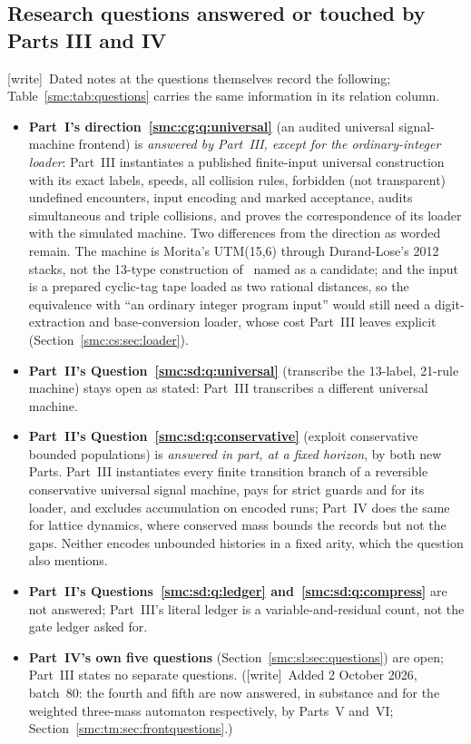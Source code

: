 \documentclass[11pt,letterpaper]{article}
\numberwithin{equation}{section}
\theoremstyle{definition}
\theoremstyle{remark}
\newcommand{\wtag}{\textup{[write]}}
\begin{document}
\subsection{Research questions answered or touched by Parts III and IV}\label{smc:cs:sec:questions}

\wtag\ Dated notes at the questions themselves record the following; Table~\ref{smc:tab:questions} carries the same information in its relation column.
\begin{itemize}
\item \textbf{Part~I's direction~\ref{smc:cg:q:universal}} (an audited universal signal-machine frontend) is \emph{answered by Part~III, except for the ordinary-integer loader}: Part~III instantiates a published finite-input universal construction with its exact labels, speeds, all collision rules, forbidden (not transparent) undefined encounters, input encoding and marked acceptance, audits simultaneous and triple collisions, and proves the correspondence of its loader with the simulated machine. Two differences from the direction as worded remain. The machine is Morita's UTM(15,6) through Durand-Lose's 2012 stacks, not the 13-type construction of~\cite{durandlose} named as a candidate; and the input is a prepared cyclic-tag tape loaded as two rational distances, so the equivalence with ``an ordinary integer program input'' would still need a digit-extraction and base-conversion loader, whose cost Part~III leaves explicit (Section~\ref{smc:cs:sec:loader}).
\item \textbf{Part~II's Question~\ref{smc:sd:q:universal}} (transcribe the 13-label, 21-rule machine) stays open as stated: Part~III transcribes a different universal machine.
\item \textbf{Part~II's Question~\ref{smc:sd:q:conservative}} (exploit conservative bounded populations) is \emph{answered in part, at a fixed horizon}, by both new Parts. Part~III instantiates every finite transition branch of a reversible conservative universal signal machine, pays for strict guards and for its loader, and excludes accumulation on encoded runs; Part~IV does the same for lattice dynamics, where conserved mass bounds the records but not the gaps. Neither encodes unbounded histories in a fixed arity, which the question also mentions.
\item \textbf{Part~II's Questions~\ref{smc:sd:q:ledger} and~\ref{smc:sd:q:compress}} are not answered; Part~III's literal ledger is a variable-and-residual count, not the gate ledger asked for.
\item \textbf{Part~IV's own five questions} (Section~\ref{smc:sl:sec:questions}) are open; Part~III states no separate questions. (\wtag\ Added 2 October 2026, batch~80: the fourth and fifth are now answered, in substance and for the weighted three-mass automaton respectively, by Parts~V and~VI; Section~\ref{smc:tm:sec:frontquestions}.)
\end{itemize}
\end{document}

